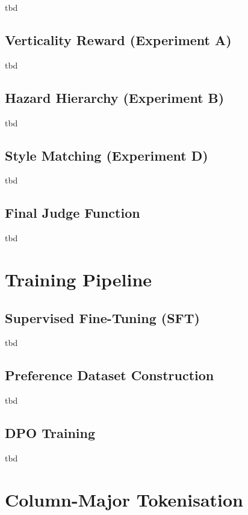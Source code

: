 \documentclass[shortabstract, mgr, english]{iithesis}
\begin{document}
tbd

\subsection{Verticality Reward (Experiment A)}
\label{subsec:dpo-judge-vert}

tbd

\subsection{Hazard Hierarchy (Experiment B)}
\label{subsec:dpo-judge-hazard}

tbd

\subsection{Style Matching (Experiment D)}
\label{subsec:dpo-judge-style}

tbd

\subsection{Final Judge Function}
\label{subsec:dpo-judge-final}

tbd

\section{Training Pipeline}
\label{sec:dpo-training}

\subsection{Supervised Fine-Tuning (SFT)}
\label{subsec:dpo-sft}

tbd

\subsection{Preference Dataset Construction}
\label{subsec:dpo-dataset}

tbd

\subsection{DPO Training}
\label{subsec:dpo-training-details}

tbd

\section{Column-Major Tokenisation}
\label{sec:dpo-tokenisation}
\end{document}
